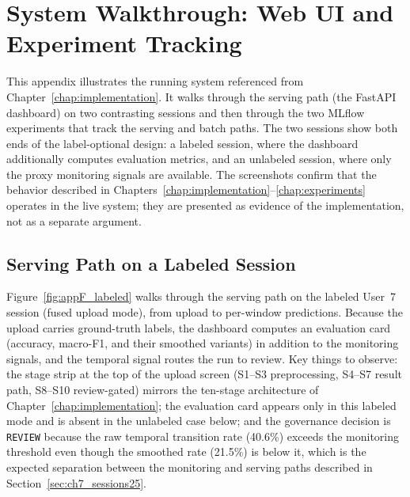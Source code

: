 \chapter{System Walkthrough: Web UI and Experiment Tracking}
\label{app:walkthrough}

This appendix illustrates the running system referenced from Chapter~\ref{chap:implementation}. It walks through the serving path (the FastAPI dashboard) on two contrasting sessions and then through the two MLflow experiments that track the serving and batch paths. The two sessions show both ends of the label-optional design: a labeled session, where the dashboard additionally computes evaluation metrics, and an unlabeled session, where only the proxy monitoring signals are available. The screenshots confirm that the behavior described in Chapters~\ref{chap:implementation}--\ref{chap:experiments} operates in the live system; they are presented as evidence of the implementation, not as a separate argument.

\section{Serving Path on a Labeled Session}
\label{app:walkthrough_labeled}

Figure~\ref{fig:appF_labeled} walks through the serving path on the labeled User~7 session (fused upload mode), from upload to per-window predictions. Because the upload carries ground-truth labels, the dashboard computes an evaluation card (accuracy, macro-F1, and their smoothed variants) in addition to the monitoring signals, and the temporal signal routes the run to review. Key things to observe: the stage strip at the top of the upload screen (S1--S3 preprocessing, S4--S7 result path, S8--S10 review-gated) mirrors the ten-stage architecture of Chapter~\ref{chap:implementation}; the evaluation card appears only in this labeled mode and is absent in the unlabeled case below; and the governance decision is \texttt{REVIEW} because the raw temporal transition rate (40.6\%) exceeds the monitoring threshold even though the smoothed rate (21.5\%) is below it, which is the expected separation between the monitoring and serving paths described in Section~\ref{sec:ch7_sessions25}.

